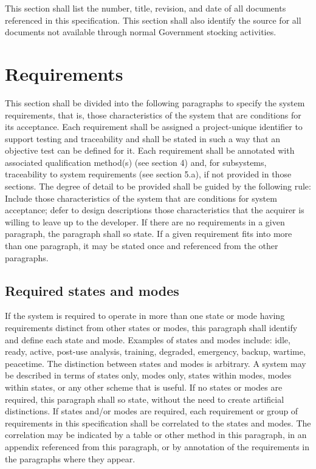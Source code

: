 \documentclass{fidata-report-template}
\begin{document}
This section shall list the number, title, revision, and date of all
documents referenced in this specification. This section shall also
identify the source for all documents not available through normal
Government stocking activities.

\section{Requirements}

This section shall be divided into the following paragraphs to specify
the system requirements, that is, those characteristics of the system
that are conditions for its acceptance. Each requirement shall be
assigned a project-unique identifier to support testing and traceability
and shall be stated in such a way that an objective test can be defined
for it. Each requirement shall be annotated with associated
qualification method(s) (see section 4) and, for subsystems,
traceability to system requirements (see section 5.a), if not provided
in those sections. The degree of detail to be provided shall be guided
by the following rule: Include those characteristics of the system that
are conditions for system acceptance; defer to design descriptions those
characteristics that the acquirer is willing to leave up to the
developer. If there are no requirements in a given paragraph, the
paragraph shall so state. If a given requirement fits into more than one
paragraph, it may be stated once and referenced from the other
paragraphs.

\subsection{Required states and modes}

If the system is required to operate in more than one state or mode
having requirements distinct from other states or modes, this paragraph
shall identify and define each state and mode. Examples of states and
modes include: idle, ready, active, post-use analysis, training,
degraded, emergency, backup, wartime, peacetime. The distinction between
states and modes is arbitrary. A system may be described in terms of
states only, modes only, states within modes, modes within states, or
any other scheme that is useful. If no states or modes are required,
this paragraph shall so state, without the need to create artificial
distinctions. If states and/or modes are required, each requirement or
group of requirements in this specification shall be correlated to the
states and modes. The correlation may be indicated by a table or other
method in this paragraph, in an appendix referenced from this paragraph,
or by annotation of the requirements in the paragraphs where they
appear.
\end{document}
